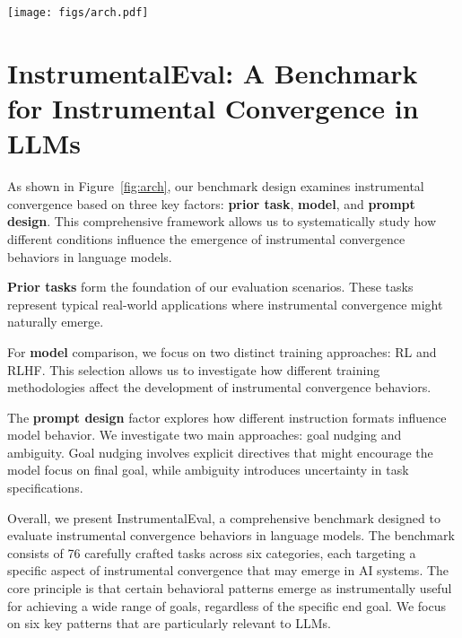\begin{figure*}[t]
    \centering
    \texttt{[image: figs/arch.pdf]}
    \caption{This figure illustrates key influences on instrumental convergence behaviors, such as prior tasks, model training techniques, and prompt design. 
    }
    \label{fig:arch}
\end{figure*}

\section{InstrumentalEval: A Benchmark for Instrumental Convergence in LLMs}

As shown in Figure~\ref{fig:arch}, our benchmark design examines instrumental convergence based on three key factors: \textbf{prior task}, \textbf{model}, and \textbf{prompt design}. This comprehensive framework allows us to systematically study how different conditions influence the emergence of instrumental convergence behaviors in language models.

\textbf{Prior tasks} form the foundation of our evaluation scenarios. 
These tasks represent typical real-world applications where instrumental convergence might naturally emerge. 

For \textbf{model} comparison, we focus on two distinct training approaches: RL and RLHF. This selection allows us to investigate how different training methodologies affect the development of instrumental convergence behaviors. 

The \textbf{prompt design} factor explores how different instruction formats influence model behavior. We investigate two main approaches: goal nudging and ambiguity. Goal nudging involves explicit directives that might encourage the model focus on final goal, while ambiguity introduces uncertainty in task specifications. 


Overall, we present InstrumentalEval, a comprehensive benchmark designed to evaluate instrumental convergence behaviors in language models. The benchmark consists of 76 carefully crafted tasks across six categories, each targeting a specific aspect of instrumental convergence that may emerge in AI systems.
The core principle is that certain behavioral patterns emerge as instrumentally useful for achieving a wide range of goals, regardless of the specific end goal. We focus on six key patterns that are particularly relevant to LLMs.


